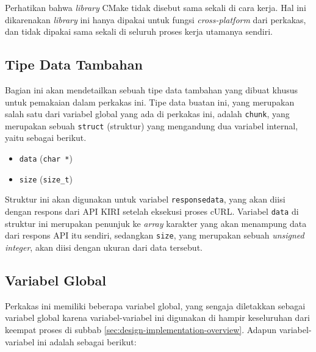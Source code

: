 Perhatikan bahwa \textit{library} CMake tidak disebut sama sekali di cara kerja. Hal ini dikarenakan \textit{library} ini hanya dipakai untuk fungsi \textit{cross-platform} dari perkakas, dan tidak dipakai sama sekali di seluruh proses kerja utamanya sendiri.

\subsection{Tipe Data Tambahan}
\label{sec:design-implementation-customtypes}

Bagian ini akan mendetailkan sebuah tipe data tambahan yang dibuat khusus untuk pemakaian dalam perkakas ini. Tipe data buatan ini, yang merupakan salah satu dari variabel global yang ada di perkakas ini, adalah \verb|chunk|, yang merupakan sebuah \verb|struct| (struktur) yang mengandung dua variabel internal, yaitu sebagai berikut.

\begin{itemize}
	\item \verb|data| (\verb|char *|)
	\item \verb|size| (\verb|size_t|)
\end{itemize}
\noindent
Struktur ini akan digunakan untuk variabel \verb|responsedata|, yang akan diisi dengan respons dari API KIRI setelah eksekusi proses cURL. Variabel \verb|data| di struktur ini merupakan penunjuk ke \textit{array} karakter yang akan menampung data dari respons API itu sendiri, sedangkan \verb|size|, yang merupakan sebuah \textit{unsigned integer}, akan diisi dengan ukuran dari data tersebut.

\subsection{Variabel Global}
\label{sec:design-implementation-globalvars}

Perkakas ini memiliki beberapa variabel global, yang sengaja diletakkan sebagai variabel global karena variabel-variabel ini digunakan di hampir keseluruhan dari keempat proses di subbab \ref{sec:design-implementation-overview}. Adapun variabel-variabel ini adalah sebagai berikut:


